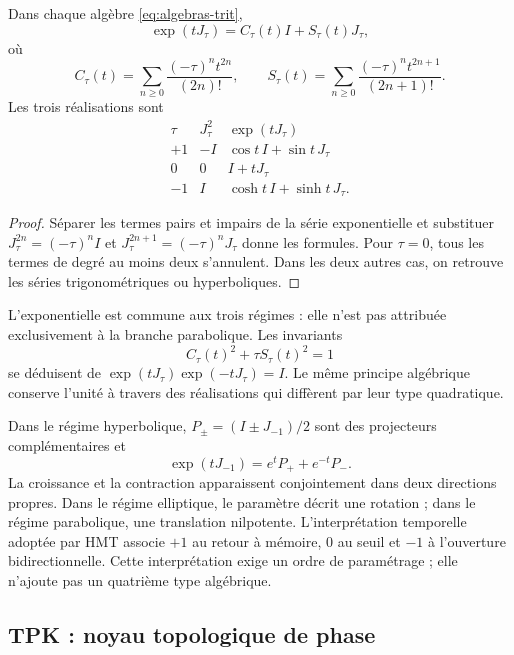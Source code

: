 \begin{proposition}
Dans chaque algèbre \eqref{eq:algebras-trit},
\begin{equation}
 \exp(tJ_\tau)=C_\tau(t)I+S_\tau(t)J_\tau,
\end{equation}
où
\[
 C_\tau(t)=\sum_{n\ge0}\frac{(-\tau)^nt^{2n}}{(2n)!},\qquad
 S_\tau(t)=\sum_{n\ge0}\frac{(-\tau)^nt^{2n+1}}{(2n+1)!}.
\]
Les trois réalisations sont
\[
 \begin{array}{c|c|c}
 \tau&J_\tau^2&\exp(tJ_\tau)\\\hline
 +1&-I&\cos t\,I+\sin t\,J_\tau\\
 0&0&I+tJ_\tau\\
 -1&I&\cosh t\,I+\sinh t\,J_\tau.
 \end{array}
\]
\end{proposition}
\begin{proof}
Séparer les termes pairs et impairs de la série exponentielle et substituer \(J_\tau^{2n}=(-\tau)^nI\) et \(J_\tau^{2n+1}=(-\tau)^nJ_\tau\) donne les formules. Pour \(\tau=0\), tous les termes de degré au moins deux s'annulent. Dans les deux autres cas, on retrouve les séries trigonométriques ou hyperboliques.
\end{proof}

L'exponentielle est commune aux trois régimes : elle n'est pas attribuée exclusivement à la branche parabolique. Les invariants
\[
 C_\tau(t)^2+\tau S_\tau(t)^2=1
\]
se déduisent de \(\exp(tJ_\tau)\exp(-tJ_\tau)=I\). Le même principe algébrique conserve l'unité à travers des réalisations qui diffèrent par leur type quadratique.

Dans le régime hyperbolique, \(P_\pm=(I\pm J_{-1})/2\) sont des projecteurs complémentaires et
\[
 \exp(tJ_{-1})=e^tP_++e^{-t}P_-.
\]
La croissance et la contraction apparaissent conjointement dans deux directions propres. Dans le régime elliptique, le paramètre décrit une rotation ; dans le régime parabolique, une translation nilpotente. L'interprétation temporelle adoptée par HMT associe \(+1\) au retour à mémoire, \(0\) au seuil et \(-1\) à l'ouverture bidirectionnelle. Cette interprétation exige un ordre de paramétrage ; elle n'ajoute pas un quatrième type algébrique.





\subsection{TPK : noyau topologique de phase}

